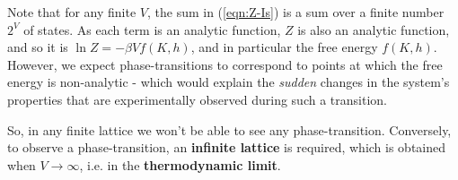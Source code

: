 \documentclass[../../main.tex]{subfiles}
\begin{document}
Note that for any finite $V$, the sum in (\ref{eqn:Z-Is}) is a sum over a finite number $2^V$ of states. As each term is an analytic function, $Z$ is also an analytic function, and so it is $\ln Z = - \beta V f(K,h)$, and in particular the free energy $f(K,h)$. However, we expect phase-transitions to correspond to points at which the free energy is non-analytic - which would explain the \textit{sudden} changes in the system's properties that are experimentally observed during such a transition. %

So, in any finite lattice we won't be able to see any phase-transition. Conversely, to observe a phase-transition, an \textbf{infinite lattice} is required, which is obtained when $V \to \infty$, i.e. in the \textbf{thermodynamic limit}. 
\end{document}
